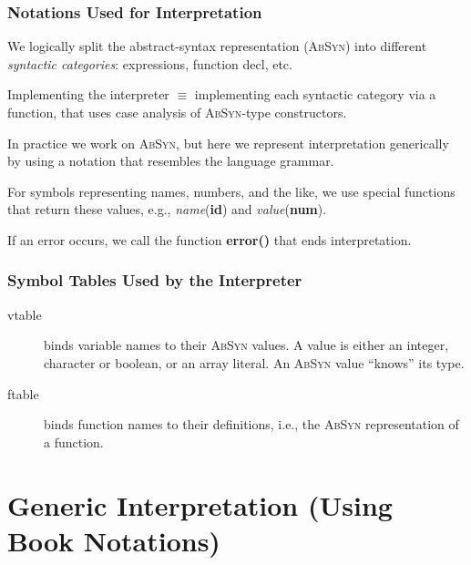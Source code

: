 \documentclass{beamer}
\begin{document}
\begin{frame}[fragile,t]
   \frametitle{Notations Used for Interpretation}

We logically split the abstract-syntax representation (\textsc{AbSyn}) into
different {\em syntactic categories}: expressions, function decl, etc.

\bigskip

Implementing the interpreter $\equiv$ implementing each syntactic category
via a function, that uses case analysis of \textsc{AbSyn}-type constructors.

\bigskip

In practice we work on \textsc{AbSyn}, but here we represent interpretation
generically by using a notation that resembles the language grammar.

\bigskip

For symbols representing names, numbers, and the like, we use special
functions that return these values, e.g., {\em name}({\bf id}) and 
{\em value}({\bf num}).

\bigskip

If an error occurs, we call the function {\bf error()} that ends interpretation.

\end{frame}

\begin{frame}[fragile,t]
   \frametitle{Symbol Tables Used by the Interpreter}

\bigskip
\bigskip

\begin{description}
    \item[vtable] binds variable names to their \textsc{AbSyn} values.
        A value is either an integer, character or boolean, or an array literal. 
        An \textsc{AbSyn} value ``knows'' its type.\bigskip

    \item[ftable] binds function names to their definitions, i.e., 
            the \textsc{AbSyn} representation of a function.
\end{description}
\end{frame}


\section{Generic Interpretation (Using Book Notations)}

\begin{frame}[fragile]
	\tableofcontents[currentsection]
\end{frame}
\end{document}
